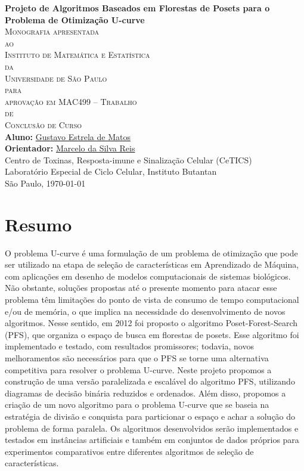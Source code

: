 \documentclass[12pt, twoside]{report}
\numberwithin{mydefinition}{section}
\numberwithin{mytheorem}{section}
\numberwithin{mylemma}{section}
\numberwithin{corollary}{section}
\begin{document}
\thispagestyle{empty}
\begin{center}
{\Large
{\bf Projeto de Algoritmos Baseados em Florestas de Posets para o 
     Problema de Otimização U-curve}\\
\bigskip
\bigskip
\bigskip
\textsc{
    Monografia apresentada\\[-0.25cm] 
    ao\\[-0.25cm]
    Instituto de Matemática e Estatística\\[-0.25cm]
    da\\[-0.25cm]
    Universidade de São Paulo\\[-0.25cm]
    para\\[-0.25cm]
    aprovação em MAC499 -- Trabalho\\[-0.25cm]
    de\\[-0.25cm]
    Conclusão de Curso}\\
\bigskip
\bigskip
\bigskip
{\bf Aluno:} \href{mailto:gustavo.estrela.matos@gmail.com}{Gustavo Estrela de Matos}\\
\bigskip
{\bf Orientador:} \href{mailto:marcelo.reis@butantan.gov.br}{Marcelo da Silva Reis}\\
\bigskip
\bigskip
\bigskip
Centro de Toxinas, Resposta-imune e Sinalização Celular (CeTICS)\\
\bigskip
Laboratório Especial de Ciclo Celular, Instituto Butantan\\
\bigskip
\bigskip
\bigskip
São Paulo, \today
}
\end{center}
\newpage

\chapter*{Resumo}
O problema U-curve é uma formulação de um problema de otimização que 
pode ser utilizado na etapa de seleção de características em Aprendizado
de Máquina, com aplicações em desenho de modelos computacionais de 
sistemas biológicos. Não obstante, soluções propostas até o presente 
momento para atacar esse problema têm limitações do ponto de vista de 
consumo de tempo computacional e/ou de memória, o que implica na 
necessidade do desenvolvimento de novos algoritmos. Nesse sentido, em 
2012 foi proposto o algoritmo Poset-Forest-Search (PFS), que organiza o
espaço de busca em florestas de posets. Esse algoritmo foi implementado 
e testado, com resultados promissores; todavia, novos melhoramentos são
necessários para que o PFS se torne uma alternativa competitiva para 
resolver o problema U-curve. Neste projeto propomos a construção de uma 
versão paralelizada e escalável do algoritmo PFS, utilizando diagramas 
de decisão binária reduzidos e ordenados. Além disso, propomos a criação
de um novo algoritmo para o problema U-curve que se baseia na estratégia
de divisão e conquista para particionar o espaço e achar a solução do
problema de forma paralela. Os algoritmos desenvolvidos serão 
implementados e testados em instâncias artificiais e também em 
conjuntos de dados próprios para experimentos comparativos entre 
diferentes algoritmos de seleção de características.
\end{document}

